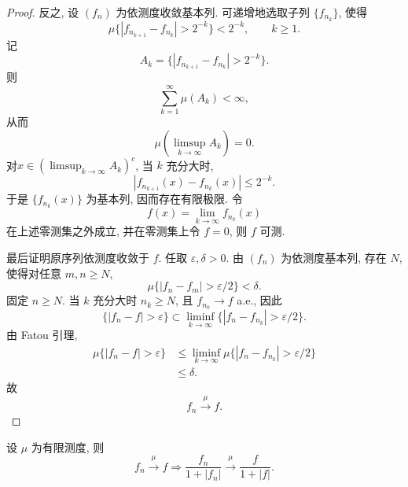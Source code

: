 \begin{proof}
            反之, 设 $(f_n)$ 为依测度收敛基本列. 可递增地选取子列
            $\{f_{n_k}\}$, 使得
            \[
                \mu\bigl\{|f_{n_{k+1}}-f_{n_k}|>2^{-k}\bigr\}<2^{-k},
                \qquad k\geqslant1.
            \]
            记
            \[
                A_k=\{|f_{n_{k+1}}-f_{n_k}|>2^{-k}\}.
            \]
            则
            \[
                \sum_{k=1}^\infty\mu(A_k)<\infty,
            \]
            从而
            \[
                \mu\left(\limsup_{k\to\infty}A_k\right)=0.
            \]
            对$x\in(\displaystyle\limsup_{k\to\infty}A_k)^c$, 当 $k$ 充分大时,
            \[
                |f_{n_{k+1}}(x)-f_{n_k}(x)|\leqslant2^{-k}.
            \]
            于是 $\{f_{n_k}(x)\}$ 为基本列, 因而存在有限极限. 令
            \[
                f(x)=\lim_{k\to\infty}f_{n_k}(x)
            \]
            在上述零测集之外成立, 并在零测集上令 $f=0$, 则 $f$ 可测.

            最后证明原序列依测度收敛于 $f$. 任取 $\varepsilon,\delta>0$.
            由 $(f_n)$ 为依测度基本列, 存在 $N$, 使得对任意 $m,n\geqslant N$,
            \[
                \mu\{|f_n-f_m|>\varepsilon/2\}<\delta.
            \]
            固定 $n\geqslant N$. 当 $k$ 充分大时 $n_k\geqslant N$, 且
            $f_{n_k}\to f$ a.e., 因此
            \[
                \{|f_n-f|>\varepsilon\}
                \subset
                \liminf_{k\to\infty}
                \{|f_n-f_{n_k}|>\varepsilon/2\}.
            \]
            由 Fatou 引理,
            \[
            \begin{aligned}
                \mu\{|f_n-f|>\varepsilon\}
                &\leqslant
                \liminf_{k\to\infty}
                \mu\{|f_n-f_{n_k}|>\varepsilon/2\}\\
                &\leqslant\delta.
            \end{aligned}
            \]
            故
            \[
                f_n\stackrel{\mu}{\longrightarrow}f.
            \]
        \end{proof}
        \begin{4}
            设 $\mu$ 为有限测度, 则
            \[
                f_n\stackrel{\mu}{\longrightarrow}f \Rightarrow \frac{f_n}{1+|f_n|}\stackrel{\mu}{\longrightarrow}\frac{f}{1+|f|}.
            \]
        \end{4}
